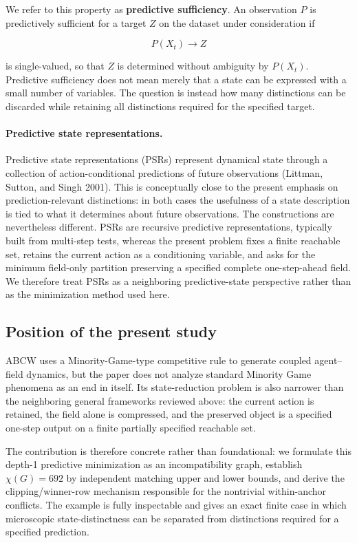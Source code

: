 \documentclass[
  11pt,
]{article}
\begin{document}
We refer to this property as \textbf{predictive sufficiency}. An
observation \({P}\) is predictively sufficient for a target \({Z}\) on
the dataset under consideration if

\[{P(X_t)\longrightarrow Z}\]

is single-valued, so that \({Z}\) is determined without ambiguity by
\({P(X_t)}\). Predictive sufficiency does not mean merely that a state
can be expressed with a small number of variables. The question is
instead how many distinctions can be discarded while retaining all
distinctions required for the specified target.

\paragraph{Predictive state representations.}
Predictive state representations (PSRs) represent dynamical state through
a collection of action-conditional predictions of future observations
(Littman, Sutton, and Singh 2001). This is conceptually close to the
present emphasis on prediction-relevant distinctions: in both cases the
usefulness of a state description is tied to what it determines about
future observations. The constructions are nevertheless different.
PSRs are recursive predictive representations, typically built from
multi-step tests, whereas the present problem fixes a finite reachable
set, retains the current action as a conditioning variable, and asks for
the minimum field-only partition preserving a specified complete
one-step-ahead field. We therefore treat PSRs as a neighboring
predictive-state perspective rather than as the minimization method used
here.

\hypertarget{position-of-the-present-study}{%
\subsection{Position of the present
study}\label{position-of-the-present-study}}

ABCW uses a Minority-Game-type competitive rule to generate coupled
agent--field dynamics, but the paper does not analyze standard Minority
Game phenomena as an end in itself. Its state-reduction problem is also
narrower than the neighboring general frameworks reviewed above: the
current action is retained, the field alone is compressed, and the
preserved object is a specified one-step output on a finite partially
specified reachable set.

The contribution is therefore concrete rather than foundational: we
formulate this depth-1 predictive minimization as an incompatibility
graph, establish \({\chi(G)=692}\) by independent matching upper and
lower bounds, and derive the clipping/winner-row mechanism responsible
for the nontrivial within-anchor conflicts. The example is fully
inspectable and gives an exact finite case in which microscopic
state-distinctness can be separated from distinctions required for a
specified prediction.
\end{document}
